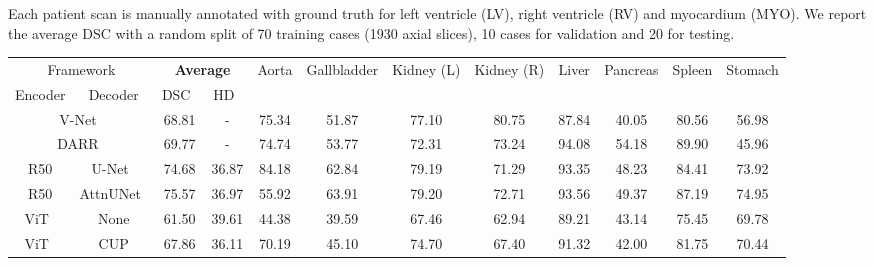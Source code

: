 \documentclass[runningheads]{llncs}
\begin{document}
Each patient scan is manually annotated with ground truth for left ventricle (LV), right ventricle (RV) and myocardium (MYO). We report the average DSC with a random split of 70 training cases (1930 axial slices), 10 cases for validation and 20 for testing.

\vspace{-1em}
\begin{table}[]
\footnotesize
\renewcommand\tabcolsep{1.0pt}
\resizebox{\textwidth}{!}
{
\begin{tabular}{cccccccccccc}
\hline
\multicolumn{2}{c}{Framework} & \multicolumn{2}{c}{\textbf{Average}} & \multirow{2}{*}{Aorta} & \multirow{2}{*}{Gallbladder} & \multirow{2}{*}{Kidney (L)} & \multirow{2}{*}{Kidney (R)} & \multirow{2}{*}{Liver} & \multirow{2}{*}{Pancreas} & \multirow{2}{*}{Spleen} & \multirow{2}{*}{Stomach} \\
\cmidrule(lr){1-2} \cmidrule(lr){3-4} 
Encoder & Decoder & DSC~ & HD~         
&          &         &             &            &             &           &             &           \\ 
\hline
\multicolumn{2}{c}{V-Net~\cite{milletari2016v}}     & 68.81        & -            & 75.34          & 51.87              & 77.10             & 80.75             & 87.84           & 40.05            & 80.56          & 56.98           \\
\multicolumn{2}{c}{DARR~\cite{fu2020domain}}      & 69.77        & -            & 74.74           & 53.77             & 72.31            & 73.24             & 94.08           & 54.18            & 89.90           & 45.96            \\
R50        & U-Net~\cite{ronneberger2015u}             & 74.68        & 36.87        & 84.18      & 62.84          & 79.19         & 71.29          & 93.35        & 48.23       & 84.41       & 73.92        \\
R50        & \scriptsize{AttnUNet}~\cite{schlemper2019attention} & 75.57   & 36.97        & 55.92      & 63.91          & 79.20         & 72.71          & 93.56       & 49.37        & 87.19       & 74.95        \\ \hline 
ViT~\cite{dosovitskiy2020image}    & None                 & 61.50        & 39.61        & 44.38      & 39.59          & 67.46         & 62.94          & 89.21       & 43.14       & 75.45       & 69.78        \\
ViT~\cite{dosovitskiy2020image}        & CUP              & 67.86        & 36.11        & 70.19      & 45.10          & 74.70         & 67.40         & 91.32       & 42.00        & 81.75       & 70.44       \\

\end{tabular}}
\end{table}
\end{document}

